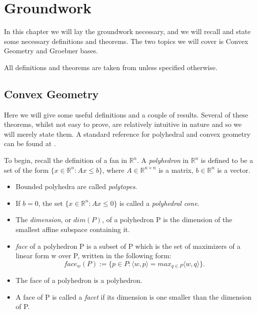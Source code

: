 \documentclass[12pt,a4paper]{report}
\begin{document}

\chapter{Groundwork}

In this chapter we will lay the groundwork necessary, and we will recall and state some necessary definitions and theorems. The two topics we will cover is Convex Geometry and Groebner bases.

All definitions and theorems are taken from \cite{AndersPHD} unless specified otherwise.

\section{Convex Geometry}
Here we will give some useful definitions and a couple of results. Several of these theorems, whilst not easy to prove, are relatively intuitive in nature and so we will merely state them. A standard reference for polyhedral and convex geometry can be found at \cite{StandardConvex}.

To begin, recall the definition of a fan in $\mathbb R^n$. 
A \emph{polyhedron} in $\mathbb R^n$ is defined to be a set of the form $\{x \in \mathbb R^n : Ax \leq b\}$, where $A \in \mathbb R^{n \times n}$ is a matrix, $b \in \mathbb R^{n}$ is a vector.
\begin{itemize}
\item Bounded polyhedra are called \emph{polytopes}.

\item If $b = 0$, the set $\{x \in \mathbb R^n : Ax \leq 0\}$ is called a \emph{polyhedral cone}.
\item The \emph{dimension}, or $dim(P)$, of a polyhedron P is the dimension of the smallest affine subspace containing it.

\item \emph{face} of a polyhedron P is a subset of P which is the set of maximizers of a linear form w over P, written in the following form:
\begin{equation*}
    face_{w} (P) := \{p \in P : \langle w,p \rangle = max_{q \in P} \langle w,q \rangle \}.
\end{equation*}

\item The face of a polyhedron is a polyhedron.
\item A face of P is called a \emph{facet} if its dimension is one smaller than the dimension of P.
\end{itemize}
\end{document}
